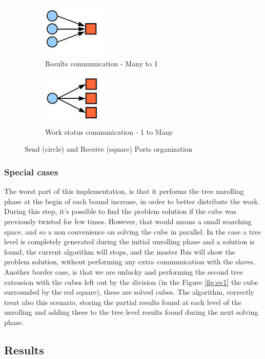 \documentclass[a4paper]{article}
\begin{document}
\begin{figure}
\begin{subfigure}{0.5\textwidth}
\centering
\includegraphics[width=0.5\linewidth]{results}
\caption{Results communication - Many to 1} \label{fig:ca}
\end{subfigure}
\hspace*{\fill} %
\begin{subfigure}{0.5\textwidth}
\centering
\includegraphics[width=0.5\linewidth]{continue}
\caption{Work status communication - 1 to Many} \label{fig:cb}
\end{subfigure}
\caption{Send (circle) and Receive (square) Ports organization} \label{fig:ports}
\end{figure}
\FloatBarrier

\subsubsection{Special cases}
\label{sec:sc}
The worst part of this implementation, is that it performs the tree unrolling phase at the begin of each bound increase, in order to better distribute the work. During this step, it's possible to find the problem solution if the cube was previously twisted for few times. However, that would means a small searching space, and so a non convenience on solving the cube in parallel. In the case a tree level is completely generated during the initial unrolling phase and a solution is found, the current algorithm will stops, and the master Ibis will show the problem solution, without performing any extra communication with the slaves. Another border case, is that we are unlucky and performing the second tree extension with the cubes left out by the division (in the Figure \ref{fig:ev1} the cube surrounded by the red square), these are solved cubes. The algorithm, correctly treat also this scenario, storing the partial results found at each level of the unrolling and adding these to the tree level results found during the next solving phase.

\subsection{Results}
\label{sec:results}


\printbibliography 
\end{document}
